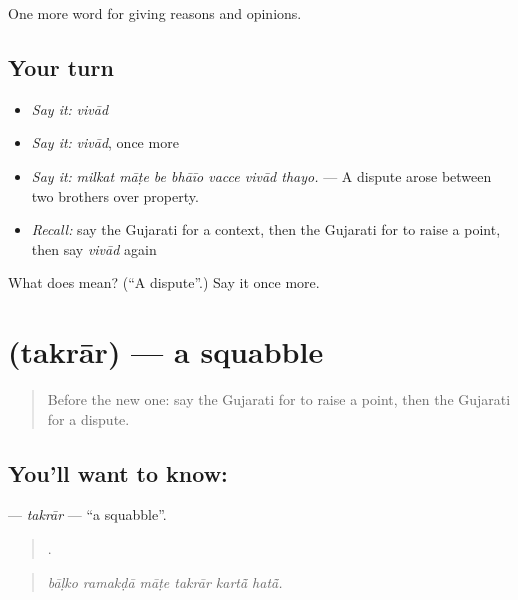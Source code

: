 \begin{grammarlens}[title={What you've built}]
One more word for giving reasons and opinions.
\end{grammarlens}

\subsection*{Your turn}
\begin{itemize}
\raggedright
  \item \emph{Say it:} \emph{vivād}
  \item \emph{Say it:} \emph{vivād}, once more
  \item \emph{Say it:} \emph{milkat māṭe be bhāīo vacce vivād thayo.} — A dispute arose between two brothers over property.
  \item \emph{Recall:} say the Gujarati for a context, then the Gujarati for to raise a point, then say \emph{vivād} again
\end{itemize}

\begin{tcolorbox}[breakable,colback=teal!4,colframe=teal!35!black,title={Before you move on}]
What does  mean? (\textquotedblleft{}A dispute\textquotedblright{}.) Say it once more.
\end{tcolorbox}
\section[\texorpdfstring{\gu{તકરાર} (takrār)}{તકરાર (takrār)}]{ (takrār) — a squabble}

\label{lesson:GU-C342-takrar}



\begin{quote}
Before the new one: say the Gujarati for to raise a point, then the Gujarati for a dispute.
\end{quote}

\subsection*{You'll want to know: }
\textbf{} — \emph{takrār} — \textquotedblleft{}a squabble\textquotedblright{}.

\begin{quote}
     .
\end{quote}

\begin{quote}
\emph{bāḷko ramakḍā māṭe takrār kartā̃ hatā̃.}
\end{quote}

